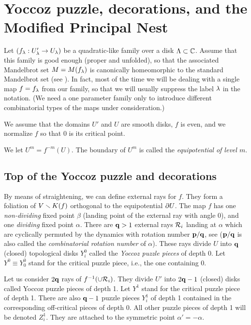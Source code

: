 \section{Yoccoz puzzle, decorations, and the Modified Principal Nest}\label{principal nest}

Let $(f_{\lambda}: U_{\lambda}'\rightarrow U_{\lambda})$ be a quadratic-like family over a disk ${\Lambda}\subset {\Bbb C}$.
Assume that this family is good enough (proper and unfolded), so that the associated
Mandelbrot set $M=M(f_{\lambda})$ is canonically homeomorphic to the standard Mandelbrot set (see \cite{DH}).
In fact, most of the time we will be dealing with a single map $f=f_{\lambda}$ from our family,
so that we will usually suppress the label ${\lambda}$  in the notation.
(We need a one parameter family only to introduce different combinatorial types of the maps
under consideration.)

We assume that the domains $U'$ and $U$ are smooth disks,
$f$ is even,
and we  normalize $f$ so that $0$ is its critical point.

We let $U^m = f^{-m}(U)$. The boundary of $U^m$ is called
the {\it equipotential of level $m$}.


\subsection{Top of the Yoccoz puzzle and  decorations}\label{sec: first king}
 By means of straightening, we can define external rays for $f$. They form a foliation of $V\smallsetminus K(f)$
orthogonal  to the equipotential $\partial U$.
 The map $f$ has one {\it non-dividing} fixed point $\beta$ (landing point of the external ray
with angle $0$), and one {\it dividing} fixed point $\alpha$. There are ${\mathbf{q}}>1$ external rays ${\mathcal R}_i$ landing at
$\alpha$ which are cyclically permuted by the dynamics with rotation number ${\mathbf{p}}/{\mathbf{q}}$, see \cite{M-rays}
(${\mathbf{p}}/{\mathbf{q}}$ is also called the {\it combinatorial rotation number} of $\alpha$).
These rays divide $U$ into ${\mathbf{q}}$ (closed) topological disks $Y^0_i$ called the {\it Yoccoz puzzle pieces} of depth 0.
Let $Y^0\equiv Y^0_0$ stand for the critical puzzle piece, i.e., the one containing 0.

Let us consider  $2{\mathbf{q}}$  rays of  $f^{-1} (\cup{\mathcal R}_i)$.
They divide $U'$ into $2{\mathbf{q}}-1$ (closed) disks called Yoccoz puzzle pieces of depth 1.
Let $Y^1$ stand for the critical puzzle piece of depth 1.
There are also ${\mathbf{q}}-1$  puzzle pieces $Y^1_i$ of depth 1 contained in the corresponding off-critical pieces of depth 0.
All other puzzle pieces of depth 1 will be denoted $Z_i^1$.
They are attached to the symmetric point $\alpha'=-\alpha$.

